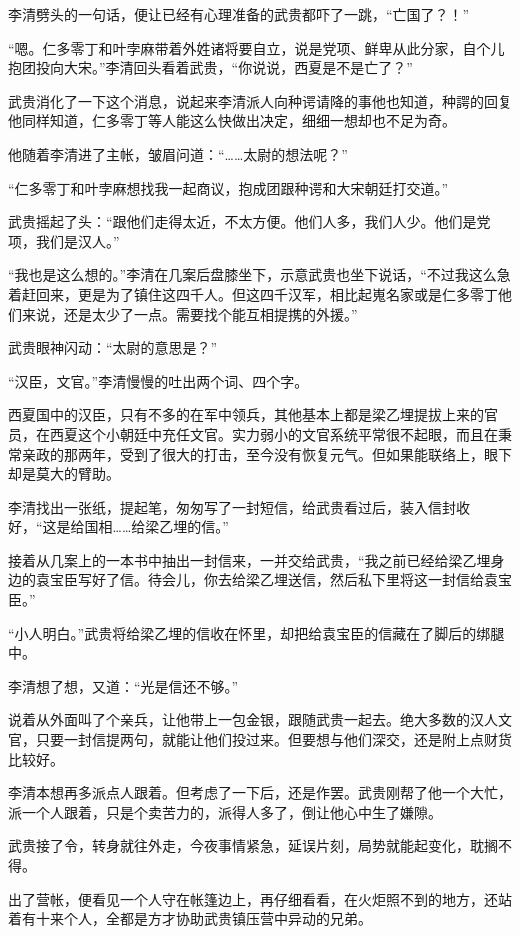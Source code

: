 李清劈头的一句话，便让已经有心理准备的武贵都吓了一跳，“亡国了？！”

“嗯。仁多零丁和叶孛麻带着外姓诸将要自立，说是党项、鲜卑从此分家，自个儿抱团投向大宋。”李清回头看着武贵，“你说说，西夏是不是亡了？”

武贵消化了一下这个消息，说起来李清派人向种谔请降的事他也知道，种諤的回复他同样知道，仁多零丁等人能这么快做出决定，细细一想却也不足为奇。

他随着李清进了主帐，皱眉问道：“……太尉的想法呢？”

“仁多零丁和叶孛麻想找我一起商议，抱成团跟种谔和大宋朝廷打交道。”

武贵摇起了头：“跟他们走得太近，不太方便。他们人多，我们人少。他们是党项，我们是汉人。”

“我也是这么想的。”李清在几案后盘膝坐下，示意武贵也坐下说话，“不过我这么急着赶回来，更是为了镇住这四千人。但这四千汉军，相比起嵬名家或是仁多零丁他们来说，还是太少了一点。需要找个能互相提携的外援。”

武贵眼神闪动：“太尉的意思是？”

“汉臣，文官。”李清慢慢的吐出两个词、四个字。

西夏国中的汉臣，只有不多的在军中领兵，其他基本上都是梁乙埋提拔上来的官员，在西夏这个小朝廷中充任文官。实力弱小的文官系统平常很不起眼，而且在秉常亲政的那两年，受到了很大的打击，至今没有恢复元气。但如果能联络上，眼下却是莫大的臂助。

李清找出一张纸，提起笔，匆匆写了一封短信，给武贵看过后，装入信封收好，“这是给国相……给梁乙埋的信。”

接着从几案上的一本书中抽出一封信来，一并交给武贵，“我之前已经给梁乙埋身边的袁宝臣写好了信。待会儿，你去给梁乙埋送信，然后私下里将这一封信给袁宝臣。”

“小人明白。”武贵将给梁乙埋的信收在怀里，却把给袁宝臣的信藏在了脚后的绑腿中。

李清想了想，又道：“光是信还不够。”

说着从外面叫了个亲兵，让他带上一包金银，跟随武贵一起去。绝大多数的汉人文官，只要一封信提两句，就能让他们投过来。但要想与他们深交，还是附上点财货比较好。

李清本想再多派点人跟着。但考虑了一下后，还是作罢。武贵刚帮了他一个大忙，派一个人跟着，只是个卖苦力的，派得人多了，倒让他心中生了嫌隙。

武贵接了令，转身就往外走，今夜事情紧急，延误片刻，局势就能起变化，耽搁不得。

出了营帐，便看见一个人守在帐篷边上，再仔细看看，在火炬照不到的地方，还站着有十来个人，全都是方才协助武贵镇压营中异动的兄弟。

